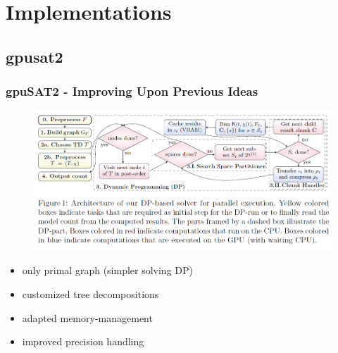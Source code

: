 \documentclass[c,8pt,xcolor...,x11names]{beamer}
\begin{document}
\section{Implementations}

\subsection{gpusat2}
\begin{frame}
	\frametitle{gpuSAT2 - Improving Upon Previous Ideas }
	\begin{figure}
		\includegraphics[height=0.3\textheight]{images/gpusat2DP.png}
	\end{figure}
	\begin{minipage}{0.49\textwidth}
		\begin{itemize}

			\item only primal graph { \small (simpler solving DP)}
			\item customized tree decompositions
			\item adapted memory-management
			\item improved precision handling


\end{itemize}
\end{minipage}
\end{frame}
\end{document}
